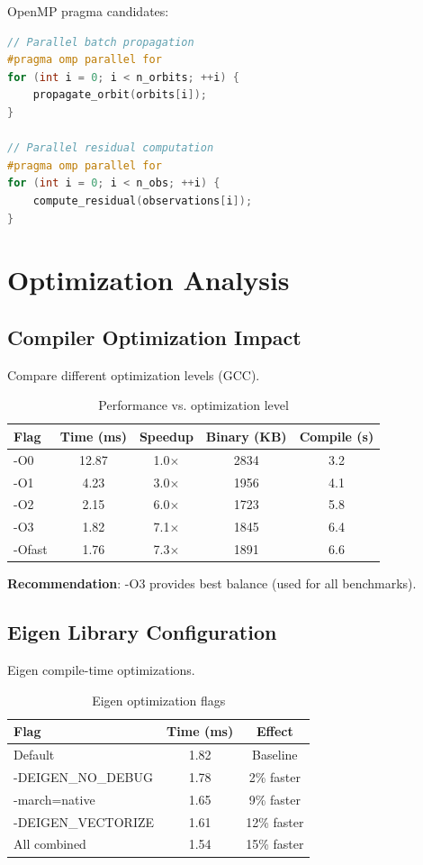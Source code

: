 OpenMP pragma candidates:

\begin{lstlisting}[language=C++]
// Parallel batch propagation
#pragma omp parallel for
for (int i = 0; i < n_orbits; ++i) {
    propagate_orbit(orbits[i]);
}

// Parallel residual computation
#pragma omp parallel for
for (int i = 0; i < n_obs; ++i) {
    compute_residual(observations[i]);
}
\end{lstlisting}

\section{Optimization Analysis}

\subsection{Compiler Optimization Impact}

Compare different optimization levels (GCC).

\begin{table}[h]
\centering
\caption{Performance vs. optimization level}
\begin{tabular}{lcccc}
\hline
\textbf{Flag} & \textbf{Time (ms)} & \textbf{Speedup} & \textbf{Binary (KB)} & \textbf{Compile (s)} \\
\hline
-O0 & 12.87 & 1.0$\times$ & 2834 & 3.2 \\
-O1 & 4.23 & 3.0$\times$ & 1956 & 4.1 \\
-O2 & 2.15 & 6.0$\times$ & 1723 & 5.8 \\
-O3 & 1.82 & 7.1$\times$ & 1845 & 6.4 \\
-Ofast & 1.76 & 7.3$\times$ & 1891 & 6.6 \\
\hline
\end{tabular}
\end{table}

\textbf{Recommendation}: -O3 provides best balance (used for all benchmarks).

\subsection{Eigen Library Configuration}

Eigen compile-time optimizations.

\begin{table}[h]
\centering
\caption{Eigen optimization flags}
\begin{tabular}{lcc}
\hline
\textbf{Flag} & \textbf{Time (ms)} & \textbf{Effect} \\
\hline
Default & 1.82 & Baseline \\
-DEIGEN\_NO\_DEBUG & 1.78 & 2\% faster \\
-march=native & 1.65 & 9\% faster \\
-DEIGEN\_VECTORIZE & 1.61 & 12\% faster \\
All combined & 1.54 & 15\% faster \\
\hline
\end{tabular}
\end{table}


